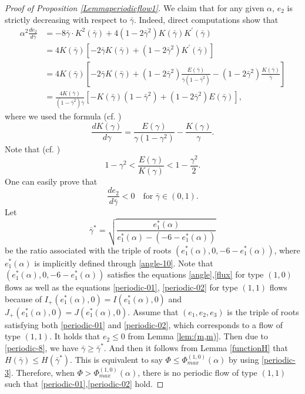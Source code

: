 \documentclass[reqno,12pt]{amsart}
\begin{document}
\begin{proof}[Proof of Proposition \ref{Lemmaperiodicflow1}]
We claim that for any given $\alpha$, $e_2$ is strictly decreasing with respect to $ \bar{\gamma}$. Indeed,  direct computations show that
\begin{align*}
   \alpha^2 \frac{d e_2}{d \bar{\gamma}}& = -8 \bar{\gamma} \cdot K^2( \bar{\gamma}) + 4(1- 2 \bar{\gamma}^2) K( \bar{\gamma})K^\prime( \bar{\gamma}) \\
    & = 4K( \bar{\gamma}) \left[ -2 \bar{\gamma} K( \bar{\gamma}) + (1-2 \bar{\gamma}^2)K^\prime( \bar{\gamma}) \right]\\
    & = 4K( \bar{\gamma}) \left[ -2 \bar{\gamma} K( \bar{\gamma}) +  (1- 2 \bar{\gamma}^2) \frac{E( \bar{\gamma})}{ \bar{\gamma} (1- \bar{\gamma}^2)} - (1-2 \bar{\gamma}^2) \frac{K( \bar{\gamma})}{ \bar{\gamma}}\right]\\
    &= \frac{4K( \bar{\gamma})}{(1- \bar{\gamma}^2)  \bar{\gamma}} \left[ -K( \bar{\gamma})(1- \bar{\gamma}^2) + (1-2 \bar{\gamma}^2) E( \bar{\gamma})\right], 
\end{align*} 
where we used the formula (cf. \cite[p.501]{Whittaker62})
\begin{equation}\nonumber
    \frac{dK( \gamma)}{d \gamma} = \frac{E( \gamma)}{ \gamma (1-  \gamma^2)} - \frac{K( \gamma)}{ \gamma}. 
\end{equation}
Note that (cf. \cite[Eq. (A.2)]{GuillodWittwer15SIAM})
\begin{equation}\nonumber
    1-  \gamma^2 < \frac{E( \gamma)}{K( \gamma)} < 1 - \frac{ \gamma^2}{2}. 
\end{equation}
One can easily prove that 
\begin{equation}\label{periodic-8}
    \frac{de_2}{d \bar{\gamma}} < 0 \quad \text{for}\,\,  \bar{\gamma} \in (0, 1). 
\end{equation}
Let 
\begin{equation}
\label{eq1312}
     \bar{\gamma}^*= \sqrt{\frac{e_1^*(\alpha)}{e_1^*(\alpha) - (-6 - e_1^*(\alpha))}}
\end{equation}
be the ratio associated with the triple of roots $(e_1^*(\alpha), 0, -6-e_1^*(\alpha))$, where $e_1^*(\alpha) $ is implicitly defined through \eqref{angle-10}.  
Note that  $(e_1^*(\alpha),0,-6-e_1^*(\alpha))$ satisfies the equations \eqref{angle},\eqref{flux} for type $(1,0)$ flows as well as the equations \eqref{periodic-01}, \eqref{periodic-02} for type $(1,1)$ flows because of
    $I_+(e_1^*(\alpha),0)=I(e_1^*(\alpha),0)$ and $ J_+(e_1^*(\alpha),0)=J(e_1^*(\alpha),0)$.
Assume that  $(e_1, e_2, e_3)$ is the triple of roots satisfying both \eqref{periodic-01} and \eqref{periodic-02},  which corresponds to a  flow of type $(1, 1)$. It holds that  
$e_2 \leq 0$ from Lemma \ref{lem:(m,m)}. Then due to \eqref{periodic-8}, 
we have $ \bar{\gamma} \geq  \bar{\gamma}^*.$ And then it follows from Lemma \ref{functionH} that $H( \bar{\gamma}) \leq H( \bar{\gamma}^*)$. This is equivalent to say  $\Phi \leq \Phi_{max}^{(1,0)}(\alpha)$ by using \eqref{periodic-3}. Therefore, when $\Phi>\Phi^{(1,0)}_{max}(\alpha)$, there is no periodic flow of type $(1,1)$ such that \eqref{periodic-01},\eqref{periodic-02} hold.


\end{proof}
\end{document}
